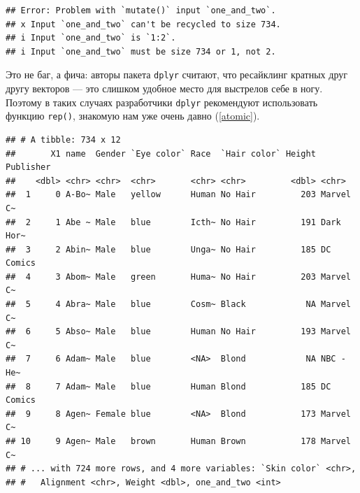 \documentclass[
]{book}
\newenvironment{Shaded}{\begin{snugshade}}{\end{snugshade}}
\newcommand{\DataTypeTok}[1]{\textcolor[rgb]{0.13,0.29,0.53}{#1}}
\newcommand{\DecValTok}[1]{\textcolor[rgb]{0.00,0.00,0.81}{#1}}
\newcommand{\KeywordTok}[1]{\textcolor[rgb]{0.13,0.29,0.53}{\textbf{#1}}}
\newcommand{\NormalTok}[1]{#1}
\newcommand{\OperatorTok}[1]{\textcolor[rgb]{0.81,0.36,0.00}{\textbf{#1}}}
\newcommand{\StringTok}[1]{\textcolor[rgb]{0.31,0.60,0.02}{#1}}
\begin{document}
\begin{Shaded}
\end{Shaded}

\begin{verbatim}
## Error: Problem with `mutate()` input `one_and_two`.
## x Input `one_and_two` can't be recycled to size 734.
## i Input `one_and_two` is `1:2`.
## i Input `one_and_two` must be size 734 or 1, not 2.
\end{verbatim}

Это не баг, а фича: авторы пакета \texttt{dplyr} считают, что ресайклинг кратных друг другу векторов --- это слишком удобное место для выстрелов себе в ногу. Поэтому в таких случаях разработчики \texttt{dplyr} рекомендуют использовать функцию \texttt{rep()}, знакомую нам уже очень давно (\ref{atomic}).

\begin{Shaded}
\end{Shaded}

\begin{verbatim}
## # A tibble: 734 x 12
##       X1 name  Gender `Eye color` Race  `Hair color` Height Publisher
##    <dbl> <chr> <chr>  <chr>       <chr> <chr>         <dbl> <chr>    
##  1     0 A-Bo~ Male   yellow      Human No Hair         203 Marvel C~
##  2     1 Abe ~ Male   blue        Icth~ No Hair         191 Dark Hor~
##  3     2 Abin~ Male   blue        Unga~ No Hair         185 DC Comics
##  4     3 Abom~ Male   green       Huma~ No Hair         203 Marvel C~
##  5     4 Abra~ Male   blue        Cosm~ Black            NA Marvel C~
##  6     5 Abso~ Male   blue        Human No Hair         193 Marvel C~
##  7     6 Adam~ Male   blue        <NA>  Blond            NA NBC - He~
##  8     7 Adam~ Male   blue        Human Blond           185 DC Comics
##  9     8 Agen~ Female blue        <NA>  Blond           173 Marvel C~
## 10     9 Agen~ Male   brown       Human Brown           178 Marvel C~
## # ... with 724 more rows, and 4 more variables: `Skin color` <chr>,
## #   Alignment <chr>, Weight <dbl>, one_and_two <int>
\end{verbatim}
\end{document}
